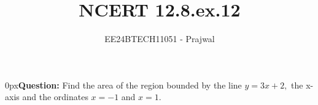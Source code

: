 \documentclass[journal]{IEEEtran}
\begin{document}

\vspace{3cm}

\title{NCERT 12.8.ex.12}
\author{EE24BTECH11051 - Prajwal}
{\let\newpage\relax\maketitle}

\renewcommand{\thefigure}{\theenumi}
\renewcommand{\thetable}{\theenumi}
\setlength{\intextsep}{10pt} %

\parindent 0px\textbf{Question:} Find the area of the region bounded by the line $y=3x+2,$ the x-axis and the ordinates $x=-1$ and $x=1.$ 
\end{document}
